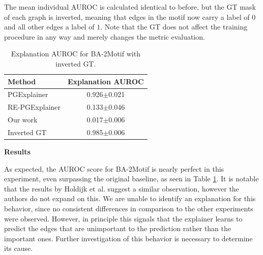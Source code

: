 The mean individual AUROC is calculated identical to before, but the \ac{GT} mask of each graph is inverted, meaning that edges in the motif now carry a label of $0$ and all other edges a label of $1$. 
Note that the \ac{GT} does not affect the training procedure in any way and merely changes the metric evaluation. \bigskip

\begin{table}[ht]
    \centering
    \scriptsize
    \begin{tabularx}{0.45\textwidth}{l c}
        \toprule
        \textbf{Method} & \textbf{Explanation AUROC} \\
        \midrule
        PGExplainer       & 0.926$\pm$0.021 \\
        RE-PGExplainer       & 0.133$\pm$0.046 \\
        Our work       & 0.017$\pm$0.006 \\
        \midrule
        Inverted GT     & 0.985$\pm$0.006 \\
        \bottomrule
    \end{tabularx}
    \caption[Inductive performance on BA-2Motif with inverted ground truth]{Explanation AUROC for BA-2Motif with inverted GT.}
    \label{tab:flippedGT}
\end{table}
\textbf{Results} \par

As expected, the AUROC score for BA-2Motif is nearly perfect in this experiment, even surpassing the original baseline, as seen in Table \ref{tab:flippedGT}. It is notable that the results by Holdijk et al. \cite{holdijk2021re} suggest a similar observation, however the authors do not expand on this. We are unable to identify an explanation for this behavior, since no consistent differences in comparison to the other experiments were observed. However, in principle this signals that the explainer learns to predict the edges that are unimportant to the prediction rather than the important ones. Further investigation of this behavior is necessary to determine its cause. 


